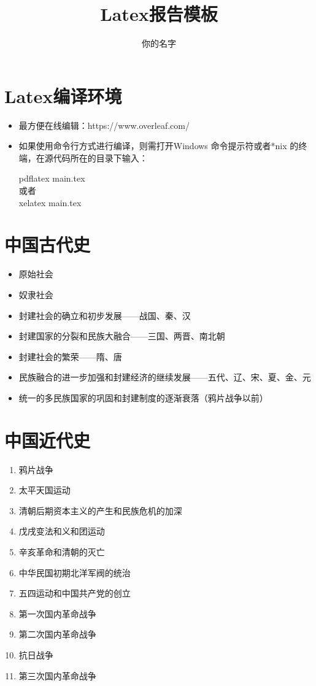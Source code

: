 \documentclass{ctexart}
\title{\centering\huge{\heiti Latex报告模板}}
\author{\small{\kaishu 你的名字}\\[2pt]
}
\begin{document}
\maketitle

\tableofcontents



\newpage
\section{Latex编译环境}
\begin{itemize}
\item 最方便在线编辑：https://www.overleaf.com/
\item 如果使用命令行方式进行编译，则需打开Windows 命令提示符或者*nix 的终端，在源代码所在的目录下输入：

pdflatex main.tex\\
或者\\
xelatex main.tex\\
\end{itemize}









\section{中国古代史}
\begin{itemize}
\item 原始社会
\item 奴隶社会
\item 封建社会的确立和初步发展——战国、秦、汉
\item 封建国家的分裂和民族大融合——三国、两晋、南北朝
\item 封建社会的繁荣——隋、唐
\item 民族融合的进一步加强和封建经济的继续发展——五代、辽、宋、夏、金、元
\item 统一的多民族国家的巩固和封建制度的逐渐衰落（鸦片战争以前）
\end{itemize}



\section{中国近代史}
\begin{enumerate}
\item 鸦片战争
\item 太平天国运动
\item 清朝后期资本主义的产生和民族危机的加深
\item 戊戌变法和义和团运动
\item 辛亥革命和清朝的灭亡
\item 中华民国初期北洋军阀的统治
\item 五四运动和中国共产党的创立
\item 第一次国内革命战争
\item 第二次国内革命战争
\item 抗日战争
\item 第三次国内革命战争
\end{enumerate}
\end{document}
